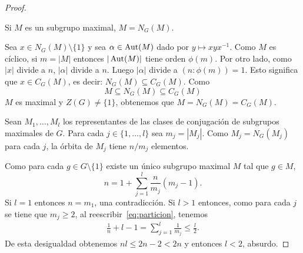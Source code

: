 \begin{proof}
	\begin{claim}
	  Si $M$ es un subgrupo maximal, $M=N_G(M)$.   
	\end{claim}

	Sea $x\in N_G(M)\setminus\{1\}$ y sea $\alpha\in\operatorname{Aut}(M)$ dado por
	$y\mapsto xyx^{-1}$. Como $M$ es cíclico, si $m=|M|$ entonces
	$|\operatorname{Aut}(M)|$ tiene orden $\phi(m)$. Por otro lado, como $|x|$ divide a
	$n$, $|\alpha|$ divide a $n$. Luego $|\alpha|$ divide a
	$(n:\phi(m))=1$. Esto significa que $x\in C_G(M)$, es decir:
	$N_G(M)\subseteq C_G(M)$. Como
	\[
	M\subseteq N_G(M)\subseteq C_G(M)
	\]
	$M$ es maximal y $Z(G)\ne\{1\}$, obtenemos que $M=N_G(M)=C_G(M)$. 

	\medskip
	Sean $M_1,\dots,M_l$ los representantes de las clases de conjugación de
	subgrupos maximales de $G$. Para cada $j\in\{1,\dots,l\}$ sea
	$m_j=|M_j|$.  Como $M_{j}=N_G(M_j)$ para cada $j$, la órbita de $M_j$
	tiene $n/m_j$ elementos. 
	
	Como para cada $g\in G\setminus\{1\}$ existe un único subgrupo maximal
	$M$ tal que $g\in M$, 
	\begin{equation}
	  \label{eq:particion}
	  n=1+\sum_{j=1}^l \frac{n}{m_j}(m_j-1).
	\end{equation}
	Si $l=1$ entonces $n=m_1$, una contradicción. Si $l>1$ entonces, como
	para cada $j$ se tiene que $m_j\geq2$, al reescribir~\eqref{eq:particion}, tenemos
	\begin{align*}
	  \frac{1}{n}+l-1=\sum_{j=1}^l\frac{1}{m_j}\leq\frac{l}{2}.
	\end{align*}
	De esta desigualdad obtenemos $nl\leq 2n-2<2n$ y entonces $l<2$, absurdo. 
%
%
%
%
%
%
\end{proof}

